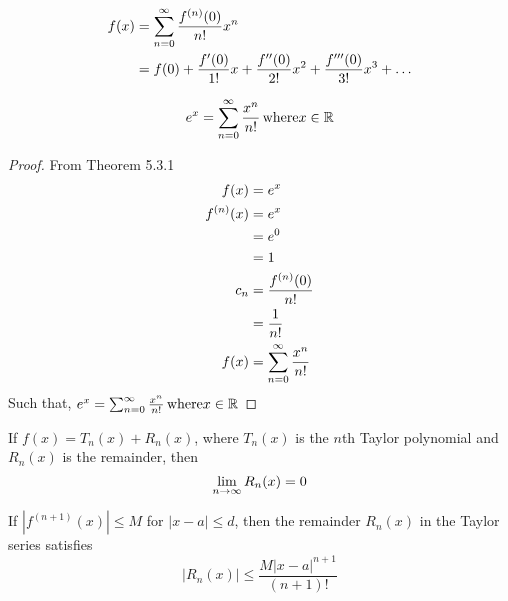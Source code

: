 \begin{corollary}
  \begin{equation}
    \nonumber
    \begin{aligned}
      f(x) &= \sum_{n=0}^{\infty} \frac{f^{(n)}(0)}{n!}x^n \\
      &= f(0) + \frac{f'(0)}{1!}x + \frac{f''(0)}{2!}x^2 + \frac{f'''(0)}{3!}x^3 + \dots
    \end{aligned}
  \end{equation}
\end{corollary}

\begin{lemma}
  \[
    e^x = \sum_{n=0}^{\infty} \frac{x^n}{n!} \, \mathrm{where} x \in \mathbb{R}
  \]
\end{lemma}

\begin{proof}
  From Theorem 5.3.1
  \begin{equation}
    \nonumber
    \begin{aligned}
      f(x) &= e^x \\
      f^{(n)}(x) &= e^x \\
      &= e^0 \\
      &= 1 \\
      c_n &= \frac{f^{(n)}(0)}{n!} \\
      &= \frac{1}{n!} \\
      f(x) &= \sum_{n=0}^{\infty} \frac{x^n}{n!} \\
    \end{aligned}
  \end{equation}
  Such that, \(e^x = \sum_{n=0}^{\infty} \frac{x^n}{n!} \, \mathrm{where} x \in \mathbb{R}\)
\end{proof}

\begin{theorem}
  If \(f(x) = T_n(x) + R_n(x)\), where \(T_n(x)\) is the \(n\)th Taylor polynomial and \(R_n(x)\) is the remainder, then
  \[
    \lim_{n \to \infty} R_n(x) = 0
  \]
\end{theorem}

\begin{theorem}
  If \(|f^{(n+1)}(x)| \leq M\) for \(|x - a| \leq d\), then the remainder \(R_n(x)\) in the Taylor series satisfies
  \[
    |R_n(x)| \leq \frac{M|x-a|^{n+1}}{(n+1)!}
  \]
\end{theorem}

\fbox{\begin{minipage}{\textwidth}
  \[
    R_n(x) = |f(x) - T_n(x)| \leq \frac{M}{(n + 1)!} \cdot |x - a|^{n + 1}  
  \]
\end{minipage}}

